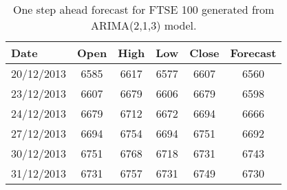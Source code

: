 \begin{table}[ht]
\centering
\caption[Forecast for FTSE 100 generated from the ARIMA model]{One step ahead forecast for FTSE 100 generated from ARIMA(2,1,3) model.} 
\label{tab:chp_ts:ftse_100_fcast}
\begin{tabular}{lccccc}
  \toprule Date & Open & High & Low & Close & Forecast \\ 
  \midrule 20/12/2013 & 6585 & 6617 & 6577 & 6607 & 6560 \\ 
  23/12/2013 & 6607 & 6679 & 6606 & 6679 & 6598 \\ 
  24/12/2013 & 6679 & 6712 & 6672 & 6694 & 6666 \\ 
  27/12/2013 & 6694 & 6754 & 6694 & 6751 & 6692 \\ 
  30/12/2013 & 6751 & 6768 & 6718 & 6731 & 6743 \\ 
  31/12/2013 & 6731 & 6757 & 6731 & 6749 & 6730 \\ 
   \bottomrule \end{tabular}
\end{table}
